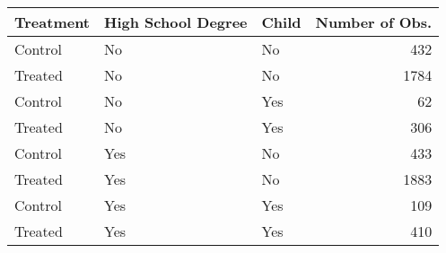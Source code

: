 \begin{tabular}{lllr}
  \hline
Treatment & High School Degree & Child & Number of Obs. \\ 
  \hline
Control & No & No & 432 \\ 
  Treated & No & No & 1784 \\ 
  Control & No & Yes &  62 \\ 
  Treated & No & Yes & 306 \\ 
  Control & Yes & No & 433 \\ 
  Treated & Yes & No & 1883 \\ 
  Control & Yes & Yes & 109 \\ 
  Treated & Yes & Yes & 410 \\ 
   \hline
\end{tabular}
